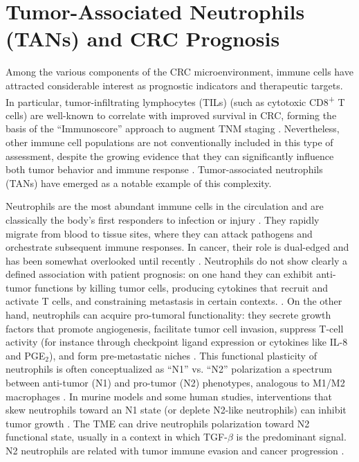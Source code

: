 \section{Tumor-Associated Neutrophils (TANs) and CRC Prognosis}
\label{sec:TAN}
Among the various components of the CRC microenvironment, immune cells have attracted considerable interest as prognostic indicators and therapeutic targets. In particular, tumor-infiltrating lymphocytes (TILs) (such as cytotoxic CD8\textsuperscript{+} T cells) are well-known to correlate with improved survival in CRC, forming the basis of the ``Immunoscore'' approach to augment TNM staging \cite{pages2018immunoscore}. Nevertheless, other immune cell populations are not conventionally included in this type of assessment, despite the growing evidence that they can significantly influence both tumor behavior and immune response \cite{vanvlerkenysla2023myeloidstates,schmid2010myeloid}. Tumor-associated neutrophils (TANs) have emerged as a notable example of this complexity.

Neutrophils are the most abundant immune cells in the circulation and are classically the body's first responders to infection or injury \cite{wu2020}. They rapidly migrate from blood to tissue sites, where they can attack pathogens and orchestrate subsequent immune responses\cite{wu2020}. In cancer, their role is dual-edged and has been somewhat overlooked until recently \cite{wu2020}. Neutrophils do not show clearly a defined association with patient prognosis: on one hand they can exhibit anti-tumor functions by killing tumor cells, producing cytokines that recruit
and activate T cells, and constraining metastasis in certain contexts. \cite{wu2020}. On the other hand, neutrophils can acquire pro-tumoral functionality: they secrete growth factors that promote angiogenesis, facilitate tumor cell invasion, suppress T-cell activity (for instance through checkpoint ligand expression or cytokines like IL-8 and PGE$_{2}$), and form pre-metastatic niches \cite{nomenclature, complexrole}. This functional plasticity of neutrophils is often conceptualized as ``N1'' vs. ``N2'' polarization a spectrum between anti-tumor (N1) and pro-tumor (N2) phenotypes, analogous to M1/M2 macrophages \cite{wu2020}. In murine models and some human studies, interventions that skew neutrophils toward an N1 state (or deplete N2-like neutrophils) can inhibit tumor growth \cite{wu2020}. The TME can drive neutrophils polarization toward N2 functional state, usually in a context in which TGF-$\beta$  is the predominant signal. N2 neutrophils are related with tumor immune evasion and cancer progression \cite{wu2020}.


